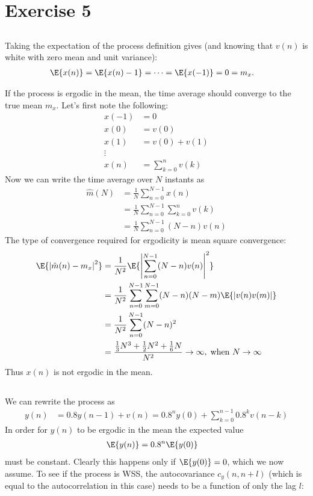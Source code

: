 
\section*{Exercise 5}
\subsection{}

Taking the expectation of the process definition gives (and knowing that $v(n)$ is white with zero mean and unit variance):
\begin{align}
	\E{x(n)}&=\E{x(n)-1}=\dots=\E{x(-1)}=0=m_x.
\end{align}

If the process is ergodic in the mean, the time average should converge to the
true mean $m_x$. Let's first note the following:
\begin{align}
	x(-1)&=0\\
	x(0)&=v(0)\\
	x(1)&=v(0)+v(1)\\
	\vdots \\
	x(n)&=\sum_{k=0}^n v(k)
\end{align}
Now we can write the time average over $N$ instants as
\begin{align}
	\hat{m}(N)&=\frac{1}{N}\sum_{n=0}^{N-1}x(n)\\
	&=\frac{1}{N}\sum_{n=0}^{N-1}\sum_{k=0}^n v(k)\\
	&=\frac{1}{N}\sum_{n=0}^{N-1}(N-n)v(n)
\end{align}
The type of convergence required for ergodicity is mean square convergence:
\begin{align}
	\E{\left|\hat{m}(n)-m_x\right|^2}&=\frac{1}{N^2}\E{\left|\sum_{n=0}^{N-1}(N-n)v(n)\right|^2}\\
	&=\frac{1}{N^2}\sum_{n=0}^{N-1}\sum_{m=0}^{N-1}(N-n)(N-m)\E{\left|v(n)v(m)\right|}\\
	&=\frac{1}{N^2}\sum_{n=0}^{N-1}(N-n)^2\\
	&=\frac{\frac{1}{3}N^3+\frac{1}{2}N^2+\frac{1}{6}N}{N^2}\to\infty,\;\text{when }N\to\infty
\end{align}
Thus $x(n)$ is not ergodic in the mean.

\subsection{}
We can rewrite the process as
\begin{align}
	y(n)&=0.8y(n-1)+v(n)
	=0.8^ny(0)+\sum_{k=0}^{n-1}0.8^kv(n-k)
\end{align}
In order for $y(n)$ to be ergodic in the mean the expected value
\begin{align}
	\E{y(n)}&=0.8^n\E{y(0)}
\end{align}
must be constant. Clearly this happens only if $\E{y(0)}=0$, which we now assume.
To see if the process is WSS, the autocovariance $c_y(n,n+l)$ (which is equal to the autocorrelation
in this case) needs to be 
a function of only the lag $l$:

